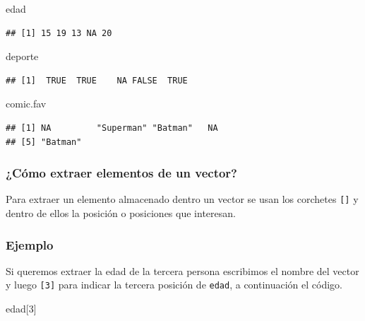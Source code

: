 \documentclass[10pt,]{krantz}
\makeatletter
\newenvironment{Shaded}{\begin{snugshade}}{\end{snugshade}}
\newcommand{\DecValTok}[1]{\textcolor[rgb]{0.00,0.00,0.81}{#1}}
\newcommand{\NormalTok}[1]{#1}
\newenvironment{kframe}{%
\medskip{}
\setlength{\fboxsep}{.8em}
 \def\at@end@of@kframe{}%
 \ifinner\ifhmode%
  \def\at@end@of@kframe{\end{minipage}}%
  \begin{minipage}{\columnwidth}%
 \fi\fi%
 \def\FrameCommand##1{\hskip\@totalleftmargin \hskip-\fboxsep
 \colorbox{shadecolor}{##1}\hskip-\fboxsep
     \hskip-\linewidth \hskip-\@totalleftmargin \hskip\columnwidth}%
 \MakeFramed {\advance\hsize-\width
   \@totalleftmargin\z@ \linewidth\hsize
   \@setminipage}}%
 {\par\unskip\endMakeFramed%
 \at@end@of@kframe}
\renewenvironment{Shaded}{\begin{kframe}}{\end{kframe}}
\makeatother
\begin{document}
\begin{Shaded}
\begin{Highlighting}[]
\NormalTok{edad}
\end{Highlighting}
\end{Shaded}

\begin{verbatim}
## [1] 15 19 13 NA 20
\end{verbatim}

\begin{Shaded}
\begin{Highlighting}[]
\NormalTok{deporte}
\end{Highlighting}
\end{Shaded}

\begin{verbatim}
## [1]  TRUE  TRUE    NA FALSE  TRUE
\end{verbatim}

\begin{Shaded}
\begin{Highlighting}[]
\NormalTok{comic.fav}
\end{Highlighting}
\end{Shaded}

\begin{verbatim}
## [1] NA         "Superman" "Batman"   NA        
## [5] "Batman"
\end{verbatim}

\subsubsection{¿Cómo extraer elementos de un
vector?}\label{como-extraer-elementos-de-un-vector}

Para extraer un elemento almacenado dentro un vector se usan los
corchetes \texttt{{[}{]}} y dentro de ellos la posición o posiciones que
interesan.

\subsubsection*{Ejemplo}\label{ejemplo}

Si queremos extraer la edad de la tercera persona escribimos el nombre
del vector y luego \texttt{{[}3{]}} para indicar la tercera posición de
\texttt{edad}, a continuación el código.

\begin{Shaded}
\begin{Highlighting}[]
\NormalTok{edad[}\DecValTok{3}\NormalTok{]}
\end{Highlighting}
\end{Shaded}
\end{document}
